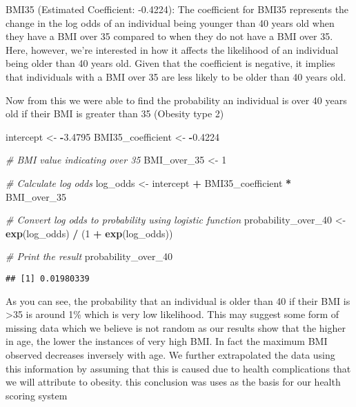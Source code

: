 \documentclass[
]{article}
\newenvironment{Shaded}{\begin{snugshade}}{\end{snugshade}}
\newcommand{\CommentTok}[1]{\textcolor[rgb]{0.56,0.35,0.01}{\textit{#1}}}
\newcommand{\DecValTok}[1]{\textcolor[rgb]{0.00,0.00,0.81}{#1}}
\newcommand{\FloatTok}[1]{\textcolor[rgb]{0.00,0.00,0.81}{#1}}
\newcommand{\FunctionTok}[1]{\textcolor[rgb]{0.13,0.29,0.53}{\textbf{#1}}}
\newcommand{\NormalTok}[1]{#1}
\newcommand{\OtherTok}[1]{\textcolor[rgb]{0.56,0.35,0.01}{#1}}
\newcommand{\SpecialCharTok}[1]{\textcolor[rgb]{0.81,0.36,0.00}{\textbf{#1}}}
\begin{document}
BMI35 (Estimated Coefficient: -0.4224): The coefficient for BMI35
represents the change in the log odds of an individual being younger
than 40 years old when they have a BMI over 35 compared to when they do
not have a BMI over 35. Here, however, we're interested in how it
affects the likelihood of an individual being older than 40 years old.
Given that the coefficient is negative, it implies that individuals with
a BMI over 35 are less likely to be older than 40 years old.

Now from this we were able to find the probability an individual is over
40 years old if their BMI is greater than 35 (Obesity type 2)

\begin{Shaded}
\begin{Highlighting}[]
\NormalTok{intercept }\OtherTok{\textless{}{-}} \SpecialCharTok{{-}}\FloatTok{3.4795}
\NormalTok{BMI35\_coefficient }\OtherTok{\textless{}{-}} \SpecialCharTok{{-}}\FloatTok{0.4224}

\CommentTok{\# BMI value indicating over 35}
\NormalTok{BMI\_over\_35 }\OtherTok{\textless{}{-}} \DecValTok{1}

\CommentTok{\# Calculate log odds}
\NormalTok{log\_odds }\OtherTok{\textless{}{-}}\NormalTok{ intercept }\SpecialCharTok{+}\NormalTok{ BMI35\_coefficient }\SpecialCharTok{*}\NormalTok{ BMI\_over\_35}

\CommentTok{\# Convert log odds to probability using logistic function}
\NormalTok{probability\_over\_40 }\OtherTok{\textless{}{-}} \FunctionTok{exp}\NormalTok{(log\_odds) }\SpecialCharTok{/}\NormalTok{ (}\DecValTok{1} \SpecialCharTok{+} \FunctionTok{exp}\NormalTok{(log\_odds))}

\CommentTok{\# Print the result}
\NormalTok{probability\_over\_40}
\end{Highlighting}
\end{Shaded}

\begin{verbatim}
## [1] 0.01980339
\end{verbatim}

As you can see, the probability that an individual is older than 40 if
their BMI is \textgreater35 is around 1\% which is very low likelihood.
This may suggest some form of missing data which we believe is not
random as our results show that the higher in age, the lower the
instances of very high BMI. In fact the maximum BMI observed decreases
inversely with age. We further extrapolated the data using this
information by assuming that this is caused due to health complications
that we will attribute to obesity. this conclusion was uses as the basis
for our health scoring system
\end{document}
